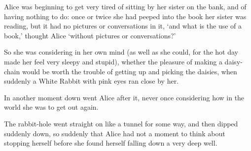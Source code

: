 \documentclass{article}
\begin{document}
\begin{figwindow}
	Alice was beginning to get very tired of sitting by her sister on the bank, and of having nothing to do: once or twice she had peeped into the book her sister was reading, but it had no pictures or conversations in it, ‘and what is the use of a book,’ thought Alice ‘without pictures or conversations?’

So she was considering in her own mind (as well as she could, for the hot day made her feel very sleepy and stupid), whether the pleasure of making a daisy-chain would be worth the trouble of getting up and picking the daisies, when suddenly a White Rabbit with pink eyes ran close by her.

In another moment down went Alice after it, never once considering how in the world she was to get out again.

The rabbit-hole went straight on like a tunnel for some way, and then dipped suddenly down, so suddenly that Alice had not a moment to think about stopping herself before she found herself falling down a very deep well.
\end{figwindow}
\end{document}

